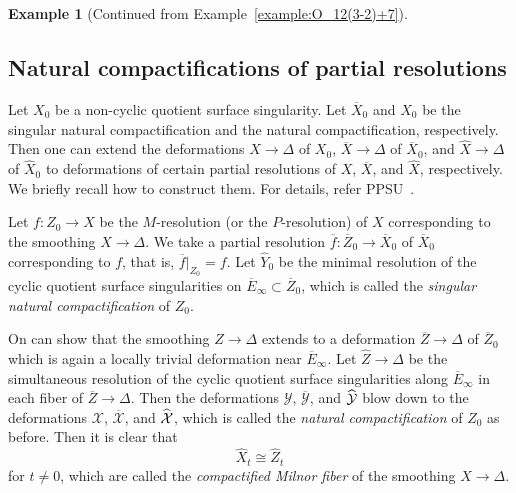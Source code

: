 \documentclass[reqno, twoside, a4paper]{amsart}
\theoremstyle{definition}
\newtheorem{example}[theorem]{Example}
\numberwithin{equation}{section}
\begin{document}
\begin{example}[Continued from Example~\ref{example:O_12(3-2)+7}]
\begin{center}
\end{center}
\end{example}






\subsection{Natural compactifications of partial resolutions}

Let $X_0$ be a non-cyclic quotient surface singularity. Let $\overline{X}_0$ and $\widehat{X}_0$ be the singular natural compactification and the natural compactification, respectively. Then one can extend the deformations $X \to \Delta$ of $X_0$, $\overline{X} \to \Delta$ of $\overline{X}_0$, and $\widehat{X} \to \Delta$ of $\widehat{X}_0$ to deformations of certain partial resolutions of $X$, $\overline{X}$, and $\widehat{X}$, respectively. We briefly recall how to construct them. For details, refer PPSU~\cite[\S7]{PPSU-2015}.

Let $f \colon Z_0 \to X$ be the $M$-resolution (or the $P$-resolution) of $X$ corresponding to the smoothing $X \to \Delta$. We take a partial resolution $\overline{f} \colon \overline{Z}_0 \to \overline{X}_0$ of $\overline{X}_0$ corresponding to $f$, that is, $\overline{f}|_{Z_0}=f$. Let $\widehat{Y}_0$ be the minimal resolution of the cyclic quotient surface singularities on $\overline{E}_{\infty} \subset \overline{Z}_0$, which is called the \emph{singular natural compactification} of $Z_0$.

On can show that the smoothing $Z \to \Delta$ extends to a deformation $\overline{Z} \to \Delta$ of $\overline{Z}_0$ which is again a locally trivial deformation near $\overline{E}_{\infty}$. Let $\widehat{Z} \to \Delta$ be the simultaneous resolution of the cyclic quotient surface singularities along $\overline{E}_{\infty}$ in each fiber of $\overline{Z} \to \Delta$. Then the deformations $\mathcal{Y}$, $\overline{\mathcal{Y}}$, and $\widehat{\smash[b]{\mathcal{Y}}}$ blow down to the deformations $\mathcal{X}$, $\overline{\mathcal{X}}$, and $\widehat{\smash[b]{\mathcal{X}}}$, which is called the \emph{natural compactification} of $Z_0$ as before. Then it is clear that
%
\begin{equation*}
\widehat{X}_t \cong \widehat{Z}_t
\end{equation*}
%
for $t \neq 0$, which are called the \emph{compactified Milnor fiber} of the smoothing $X \to \Delta$.
\end{document}

